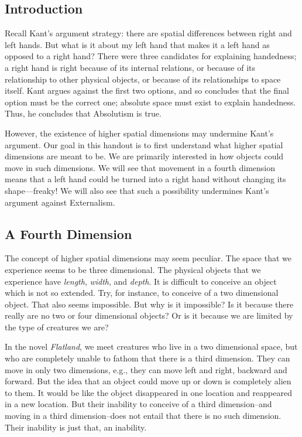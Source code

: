 \documentclass[oneside]{article}
\begin{document}
\thispagestyle{fancy}



\subsection*{Introduction}

Recall Kant's argument strategy: there are spatial differences between right and left hands. But what is it about my left hand that makes it a
left hand as opposed to a right hand? There were three candidates for explaining handedness; a right hand is right because of its internal relations, or because of its relationship to other physical objects, or because of its relationships to space itself. Kant argues against the first two options, and so concludes that the final option must be the correct one; absolute space must exist to explain handedness. Thus, he concludes that Absolutism is true. 

However, the existence of higher spatial dimensions may undermine Kant's argument. Our goal in this handout is to first understand what higher spatial dimensions are meant to be. We are primarily interested in how objects could move in such dimensions. We will see that movement in a fourth dimension means that a left hand could be turned into a right hand without changing its shape---freaky! We will also see that such a possibility undermines Kant's argument against Externalism.

\subsection*{A Fourth Dimension}

The concept of higher spatial dimensions may seem peculiar. The space that we experience seems to be three dimensional. The physical objects that we experience have \emph{length}, \emph{width}, and \emph{depth}. It is difficult to conceive an object which is not so extended. Try, for instance, to conceive of a two dimensional object. That also seems impossible. But why is it impossible? Is it because there really are no two or four dimensional objects? Or is it because we are limited by the type of creatures we are? 

In the novel \emph{Flatland}, we meet creatures who live in a two dimensional space, but who are completely unable to fathom that there is a third dimension. They can move in only two dimensions, e.g., they can move left and right, backward and forward. But the idea that an object could move up or down is completely alien to them. It would be like the object disappeared in one location and reappeared in a new location. But their inability to conceive of a third dimension--and moving in a third dimension--does not entail that there is no such dimension. Their inability is just that, an inability. 
\end{document}
